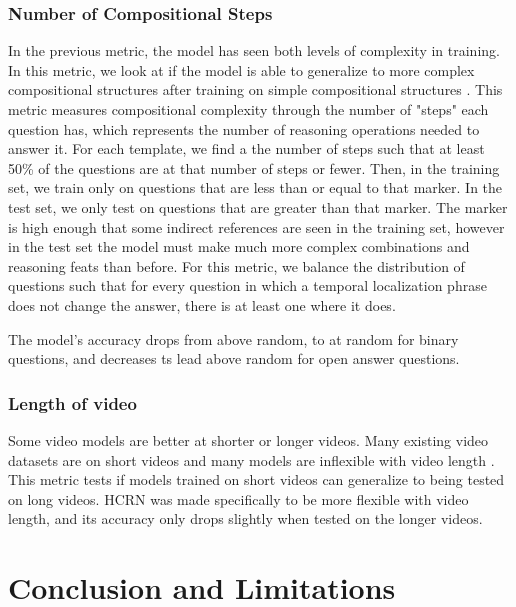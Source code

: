 \documentclass[10pt,twocolumn,letterpaper]{article}
\newcommand{\mgm}[1]{{\color{cyan}{mgm: #1}}}
\begin{document}
\mgm{May want to make a separate table for this one too }

\subsubsection{Number of Compositional Steps}

In the previous metric, the model has seen both levels of complexity in training. In this metric, we look at if the model is able to generalize to more complex compositional structures after training on simple compositional structures \cite{lake2018generalization}. This metric measures compositional complexity through the number of "steps" each question has, which represents the number of reasoning operations needed to answer it. For each template, we find a the number of steps such that at least 50\% of the questions are at that number of steps or fewer. Then, in the training set, we train only on questions that are less than or equal to that marker. In the test set, we only test on questions that are greater than that marker. The marker is high enough that some indirect references are seen in the training set, however in the test set the model must make much more complex combinations and reasoning feats than before. For this metric, we balance the distribution of questions such that for every question in which a temporal localization phrase does not change the answer, there is at least one where it does.

The model's accuracy drops from above random, to at random for binary questions, and decreases ts lead above random for open answer questions.


\subsubsection{Length of video}

Some video models are better at shorter or longer videos. Many existing video datasets are on short videos and many models are inflexible with video length \cite{le2020hierarchical}. This metric tests if models trained on short videos can generalize to being tested on long videos. HCRN was made specifically to be more flexible with video length, and its accuracy only drops slightly when tested on the longer videos.


\section{Conclusion and Limitations}
\end{document}
